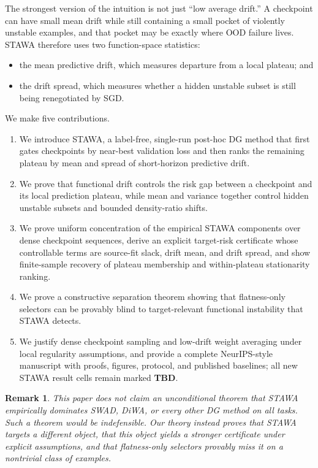 \documentclass{article}
\newtheorem{remark}{Remark}
\newcommand{\TBD}{\textbf{TBD}}
\newcommand{\ood}{OOD}
\newcommand{\stawa}{\textup{\textsc{STAWA}}}
\newcommand{\swad}{\textup{\textsc{SWAD}}}
\begin{document}
The strongest version of the intuition is not just ``low average drift.'' A checkpoint can have small mean drift while still containing a small pocket of violently unstable examples, and that pocket may be exactly where \ood{} failure lives. \stawa{} therefore uses two function-space statistics:
\begin{itemize}[leftmargin=1.4em]
    \item the mean predictive drift, which measures departure from a local plateau; and
    \item the drift spread, which measures whether a hidden unstable subset is still being renegotiated by SGD.
\end{itemize}

We make five contributions.
\begin{enumerate}[leftmargin=1.4em]
    \item We introduce \stawa{}, a label-free, single-run post-hoc DG method that first gates checkpoints by near-best validation loss and then ranks the remaining plateau by mean and spread of short-horizon predictive drift.
    \item We prove that functional drift controls the risk gap between a checkpoint and its local prediction plateau, while mean and variance together control hidden unstable subsets and bounded density-ratio shifts.
    \item We prove uniform concentration of the empirical \stawa{} components over dense checkpoint sequences, derive an explicit target-risk certificate whose controllable terms are source-fit slack, drift mean, and drift spread, and show finite-sample recovery of plateau membership and within-plateau stationarity ranking.
    \item We prove a constructive separation theorem showing that flatness-only selectors can be provably blind to target-relevant functional instability that \stawa{} detects.
    \item We justify dense checkpoint sampling and low-drift weight averaging under local regularity assumptions, and provide a complete NeurIPS-style manuscript with proofs, figures, protocol, and published baselines; all new \stawa{} result cells remain marked \TBD{}.
\end{enumerate}

\begin{remark}
This paper does \emph{not} claim an unconditional theorem that \stawa{} empirically dominates \swad{}, DiWA, or every other DG method on all tasks. Such a theorem would be indefensible. Our theory instead proves that \stawa{} targets a different object, that this object yields a stronger certificate under explicit assumptions, and that flatness-only selectors provably miss it on a nontrivial class of examples.
\end{remark}
\end{document}
